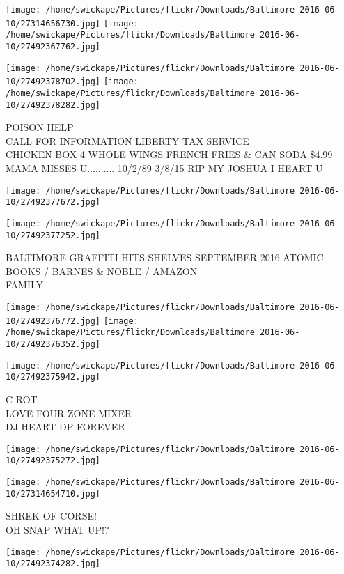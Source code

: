 \documentclass[10pt,letterpaper]{article}
\begin{document}
\texttt{[image: /home/swickape/Pictures/flickr/Downloads/Baltimore 2016-06-10/27314656730.jpg]}
\texttt{[image: /home/swickape/Pictures/flickr/Downloads/Baltimore 2016-06-10/27492367762.jpg]}

\texttt{[image: /home/swickape/Pictures/flickr/Downloads/Baltimore 2016-06-10/27492378702.jpg]}
\texttt{[image: /home/swickape/Pictures/flickr/Downloads/Baltimore 2016-06-10/27492378282.jpg]}

POISON HELP\\
CALL FOR INFORMATION LIBERTY TAX SERVICE\\
CHICKEN BOX 4 WHOLE WINGS FRENCH FRIES \& CAN SODA \$4.99\\
MAMA MISSES U.......... 10/2/89 3/8/15 RIP MY JOSHUA I HEART U
\pagebreak

\texttt{[image: /home/swickape/Pictures/flickr/Downloads/Baltimore 2016-06-10/27492377672.jpg]}

\vspace{0.25in}
\texttt{[image: /home/swickape/Pictures/flickr/Downloads/Baltimore 2016-06-10/27492377252.jpg]}

BALTIMORE GRAFFITI HITS SHELVES SEPTEMBER 2016 ATOMIC BOOKS / BARNES \& NOBLE / AMAZON\\
FAMILY
\pagebreak

\texttt{[image: /home/swickape/Pictures/flickr/Downloads/Baltimore 2016-06-10/27492376772.jpg]}
\texttt{[image: /home/swickape/Pictures/flickr/Downloads/Baltimore 2016-06-10/27492376352.jpg]}

\texttt{[image: /home/swickape/Pictures/flickr/Downloads/Baltimore 2016-06-10/27492375942.jpg]}

C{-}ROT\\
LOVE FOUR ZONE MIXER\\
DJ HEART DP FOREVER
\pagebreak

\texttt{[image: /home/swickape/Pictures/flickr/Downloads/Baltimore 2016-06-10/27492375272.jpg]}

\vspace{0.25in}
\texttt{[image: /home/swickape/Pictures/flickr/Downloads/Baltimore 2016-06-10/27314654710.jpg]}

SHREK OF CORSE!\\
OH SNAP WHAT UP!?
\pagebreak

\texttt{[image: /home/swickape/Pictures/flickr/Downloads/Baltimore 2016-06-10/27492374282.jpg]}
\end{document}
